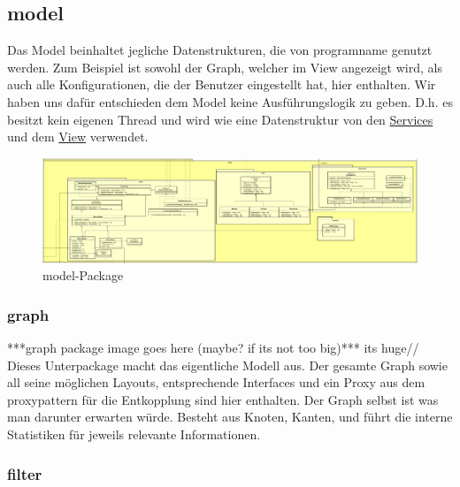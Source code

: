 \subsection{model}
\label{subsec:model}

Das Model beinhaltet jegliche Datenstrukturen, die von \gls{programname} genutzt
werden. Zum Beispiel ist sowohl der Graph, welcher im View angezeigt wird, 
als auch alle Konfigurationen, die der Benutzer eingestellt hat, hier enthalten. Wir haben uns 
dafür entschieden dem Model keine Ausführungslogik zu geben.
D.h. es besitzt kein eigenen Thread und wird wie eine Datenstruktur von den
\hyperref[subsec:service]{Services} und dem \hyperref[subsec:view]{View} verwendet.

\begin{figure}[H]
  \centering
  \includegraphics[width=\textwidth]{../diagramimages/model.png}
  \caption{model-Package}
\end{figure}

    \subsubsection{graph}
    \label{subsubsec:graph}
    ***graph package image goes here (maybe? if its not too big)*** its huge//
    \newline
    \newline
    Dieses Unterpackage macht das eigentliche Modell aus. Der gesamte Graph sowie
    all seine möglichen Layouts, entsprechende Interfaces und ein Proxy aus dem
    \gls{proxypattern} für die Entkopplung sind hier enthalten. Der Graph selbst ist was man darunter erwarten würde.
    Besteht aus Knoten, Kanten, und führt die interne Statistiken für jeweils relevante Informationen.

    \subsubsection{filter}
    \label{subsubsec:filter}
    
